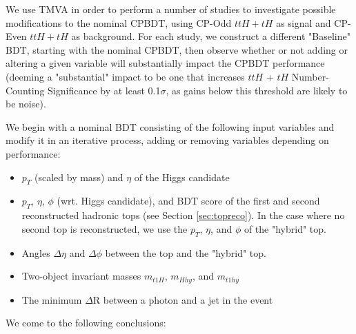 We use TMVA in order to perform a number of studies to investigate possible modifications to the nominal CPBDT, using CP-Odd $ttH+tH$ as signal and CP-Even $ttH+tH$ as background. For each study, we construct a different "Baseline" BDT, starting with the nominal CPBDT, then observe whether or not adding or altering a given variable will substantially impact the CPBDT performance (deeming a "substantial" impact to be one that increases $ttH$ + $tH$ Number-Counting Significance by at least 0.1$\sigma$, as gains below this threshold are likely to be noise).

We begin with a nominal BDT consisting of the following input variables and modify it in an iterative process, adding or removing variables depending on performance:

\begin{itemize}
\item $p_{T}$ (scaled by mass) and $\eta$ of the Higgs candidate
\item $p_{T}$, $\eta$, $\phi$ (wrt. Higgs candidate), and BDT score of the first and second reconstructed hadronic tops (see Section \ref{sec:topreco}). In the case where no second top is reconstructed, we use the $p_{T}$, $\eta$, and $\phi$ of the "hybrid" top.
\item Angles $\Delta\eta$ and $\Delta\phi$ between the top and the "hybrid" top.
\item Two-object invariant masses $m_{t1H}$, $m_{Hhy}$, and $m_{t1hy}$
\item The minimum $\Delta$R between a photon and a jet in the event
\end{itemize}

We come to the following conclusions:

